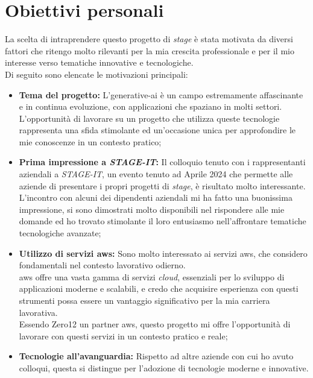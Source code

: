 \section{Obiettivi personali}
\label{sez:obiettivi-personali}

La scelta di intraprendere questo progetto di \textit{stage} è stata motivata da diversi fattori che ritengo molto rilevanti per la mia crescita professionale e per il mio interesse verso tematiche innovative e tecnologiche.\\

\noindent Di seguito sono elencate le motivazioni principali:

\begin{itemize}
    \item \textbf{Tema del progetto:} L'\gls{generative-ai} è un campo estremamente affascinante e in continua evoluzione, con applicazioni che spaziano in molti settori.\\
    L'opportunità di lavorare su un progetto che utilizza queste tecnologie rappresenta una sfida stimolante ed un'occasione unica per approfondire le mie conoscenze in un contesto pratico;
    \item \textbf{Prima impressione a \textit{STAGE-IT}:} Il colloquio tenuto con i rappresentanti aziendali a \textit{STAGE-IT}, un evento tenuto ad Aprile 2024 che permette alle aziende di presentare i propri progetti di \textit{stage}, è risultato molto interessante. \\
    L'incontro con alcuni dei dipendenti aziendali mi ha fatto una buonissima impressione, si sono dimostrati molto disponibili nel rispondere alle mie domande ed ho trovato stimolante il loro entusiasmo nell'affrontare tematiche tecnologiche avanzate;
    \item \textbf{Utilizzo di servizi \gls{aws}:} Sono molto interessato ai servizi \gls{aws}, che considero fondamentali nel contesto lavorativo odierno. \\
    \gls{aws} offre una vasta gamma di servizi \textit{cloud}, essenziali per lo sviluppo di applicazioni moderne e scalabili, e credo che acquisire esperienza con questi strumenti possa essere un vantaggio significativo per la mia carriera lavorativa.\\
    Essendo Zero12 un partner \gls{aws}, questo progetto mi offre l'opportunità di lavorare con questi servizi in un contesto pratico e reale;
    \item \textbf{Tecnologie all'avanguardia:} Rispetto ad altre aziende con cui ho avuto colloqui, questa si distingue per l'adozione di tecnologie moderne e innovative. \\

\end{itemize}
